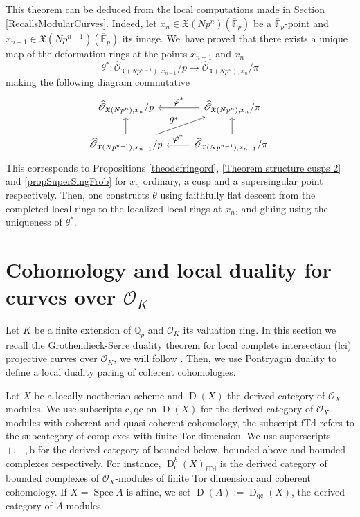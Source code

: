\documentclass[JEP,XML,SOM,Unicode,published]{cedram}
\let\ts\textstyle
\newcommand{\rb}{\mathrm{b}}
\newcommand{\rc}{\mathrm{c}}
\newcommand{\qc}{\mathrm{qc}}
\newcommand{\fTd}{\mathrm{fTd}}
\numberwithin{equation}{section}
\theoremstyle{definition}
\newcommand{\bb}[1]{\mathbb{#1}}
\newcommand{\n}[1]{\mathcal{#1}}
\newcommand{\f}[1]{\mathfrak{#1}}
\newcommand{\s}[1]{\mathscr{#1}}
\DeclareMathOperator{\D}{D}
\DeclareMathOperator{\Spec}{Spec}
\begin{document}
This theorem can be deduced from the local computations made in Section \ref{RecallsModularCurves}. Indeed, let $x_{n}\in \f{X}(Np^n)(\overline{\bb{F}}_p)$ be a $\overline{\bb{F}}_p$-point and $x_{n-1}\in \f{X}(Np^{n-1})(\overline{\bb{F}}_p)$ its image. We~have proved that there exists a unique map of the deformation rings at the points $x_{n-1}$ and $x_{n}$
\[
\theta^*: \widehat{\s{O}}_{\f{X}(Np^{n-1}), x_{n-1}} / p \to \widehat{\s{O}}_{\f{X}(Np^{n}), x_{n}} / \pi
\]
making the following diagram commutative
\[
\begin{tikzcd}
\widehat{\s{O}}_{\f{X}(Np^{n}), x_{n}} / p & \widehat{\s{O}}_{\f{X}(Np^{n}), x_{n}} / \pi \ar[l, "\ts\varphi^*"'] \\
\widehat{\s{O}}_{\f{X}(Np^{n-1}), x_{n-1}} / p \ar[u] \ar[ru, "\ts\theta^*"]& \widehat{\s{O}}_{\f{X}(Np^{n-1}), x_{n-1}} / \pi \ar[l , "\ts\varphi^*"'] \ar[u].
\end{tikzcd}
\]
This corresponds to Propositions \ref{theodefringord}, \ref{Theorem structure cusps 2} and \ref{propSuperSingFrob} for $x_{n}$ ordinary, a cusp and a supersingular point respectively. Then, one constructs $\theta$ using faithfully flat descent from the completed local rings to the localized local rings at $x_{n}$, and gluing using the uniqueness of $\theta^*$.

\section{Cohomology and local duality for curves over \texorpdfstring{$\n{O}_K$}{OK}}

\label{Reminders Duality}

Let $K$ be a finite extension of $\bb{Q}_p$ and $\n{O}_K$ its valuation ring. In this section we recall the Grothendieck-Serre duality theorem for local complete intersection (lci) projective curves over $\n{O}_K$, we will follow \cite{hartshorne1966residues}. Then, we use Pontryagin duality to define a local duality paring of coherent cohomologies.

Let $X$ be a locally noetherian scheme and $\D(X)$ the derived category of $\s{O}_X$\nobreakdash-mod\-ules. We use subscripts $\rc, \qc$ on $\D(X)$ for the derived category of $\s{O}_{X}$\nobreakdash-modules with coherent and quasi-coherent cohomology, the subscript $\fTd$ refers to the subcategory of complexes with finite Tor dimension. We use superscripts $+,-,\rb$ for the derived category of bounded below, bounded above and bounded complexes respectively. For instance, $\D_{\rc}^b(X)_{\fTd}$ is the derived category of bounded complexes of $\s{O}_{X}$-modules of finite Tor dimension and coherent cohomology. If $X=\Spec A$ is affine, we set $\D(A):=\D_{\qc}(X)$, the derived category of $A$-modules.
\end{document}
